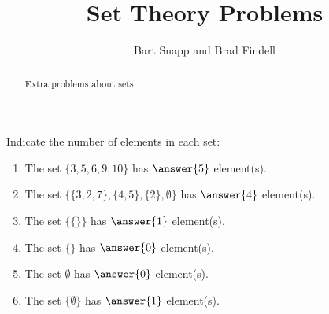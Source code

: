 \documentclass[nooutcomes]{ximera}
\title{Set Theory Problems}
\author{Bart Snapp and Brad Findell}
\begin{document}
\begin{abstract}
Extra problems about sets. 
\end{abstract}
\maketitle


\begin{problem}
Indicate the number of elements in each set: 
\begin{enumerate}
\item The set $\{3, 5, 6, 9, 10\}$ has $\answer{5}$ element(s).
\item The set $\{ \{3,2,7\}, \{4,5\}, \{2\}, \emptyset \}$ has $\answer{4}$ element(s).
\item The set $\{ \{ \} \}$ has $\answer{1}$ element(s).
\item The set $\{\}$ has $\answer{0}$ element(s).
\item The set $\emptyset$ has $\answer{0}$ element(s).
\item The set $\{ \emptyset \}$ has $\answer{1}$ element(s).
\end{enumerate}

\end{problem}
\end{document}
